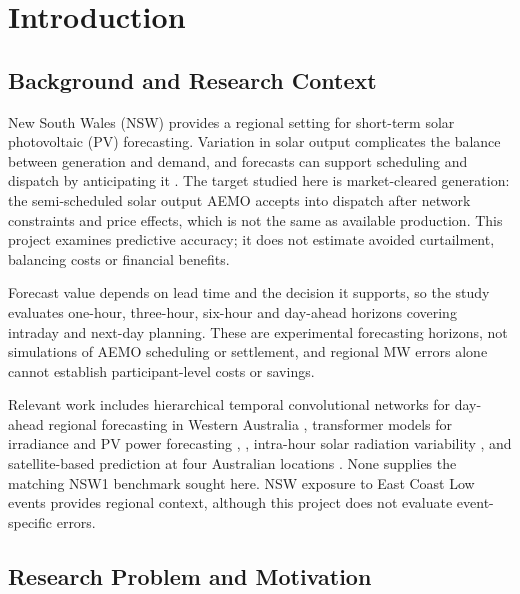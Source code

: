 \section{Introduction}

\subsection{Background and Research Context}

New South Wales (NSW) provides a regional setting for short-term solar photovoltaic (PV) forecasting. Variation in solar output complicates the balance between generation and demand, and forecasts can support scheduling and dispatch by anticipating it \cite{prasad2021prediction}. The target studied here is market-cleared generation: the semi-scheduled solar output AEMO accepts into dispatch after network constraints and price effects, which is not the same as available production. This project examines predictive accuracy; it does not estimate avoided curtailment, balancing costs or financial benefits.

Forecast value depends on lead time and the decision it supports, so the study evaluates one-hour, three-hour, six-hour and day-ahead horizons covering intraday and next-day planning. These are experimental forecasting horizons, not simulations of AEMO scheduling or settlement, and regional MW errors alone cannot establish participant-level costs or savings.

Relevant work includes hierarchical temporal convolutional networks for day-ahead regional forecasting in Western Australia \cite{perera2024dayahead}, transformer models for irradiance and PV power forecasting \cite{schubnel2025solarcross}, \cite{scott2025transformers}, intra-hour solar radiation variability \cite{huang2016intra}, and satellite-based prediction at four Australian locations \cite{prasad2021prediction}. None supplies the matching NSW1 benchmark sought here. NSW exposure to East Coast Low events \cite{bom2022ecl} provides regional context, although this project does not evaluate event-specific errors.

\subsection{Research Problem and Motivation}

